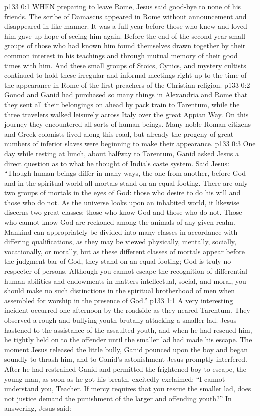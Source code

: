 \vs p133 0:1 WHEN preparing to leave Rome, Jesus said good\hyp{}bye to none of his friends. The scribe of Damascus appeared in Rome without announcement and disappeared in like manner. It was a full year before those who knew and loved him gave up hope of seeing him again. Before the end of the second year small groups of those who had known him found themselves drawn together by their common interest in his teachings and through mutual memory of their good times with him. And these small groups of Stoics, Cynics, and mystery cultists continued to hold these irregular and informal meetings right up to the time of the appearance in Rome of the first preachers of the Christian religion.
\vs p133 0:2 \pc Gonod and Ganid had purchased so many things in Alexandria and Rome that they sent all their belongings on ahead by pack train to Tarentum, while the three travelers walked leisurely across Italy over the great Appian Way. On this journey they encountered all sorts of human beings. Many noble Roman citizens and Greek colonists lived along this road, but already the progeny of great numbers of inferior slaves were beginning to make their appearance.
\vs p133 0:3 One day while resting at lunch, about halfway to Tarentum, Ganid asked Jesus a direct question as to what he thought of India’s caste system. Said Jesus: \textcolor{ubdarkred}{“Though human beings differ in many ways, the one from another, before God and in the spiritual world all mortals stand on an equal footing. There are only two groups of mortals in the eyes of God: those who desire to do his will and those who do not. As the universe looks upon an inhabited world, it likewise discerns two great classes: those who know God and those who do not. Those who cannot know God are reckoned among the animals of any given realm. Mankind can appropriately be divided into many classes in accordance with differing qualifications, as they may be viewed physically, mentally, socially, vocationally, or morally, but as these different classes of mortals appear before the judgment bar of God, they stand on an equal footing; God is truly no respecter of persons. Although you cannot escape the recognition of differential human abilities and endowments in matters intellectual, social, and moral, you should make no such distinctions in the spiritual brotherhood of men when assembled for worship in the presence of God.”}
\vs p133 1:1 A very interesting incident occurred one afternoon by the roadside as they neared Tarentum. They observed a rough and bullying youth brutally attacking a smaller lad. Jesus hastened to the assistance of the assaulted youth, and when he had rescued him, he tightly held on to the offender until the smaller lad had made his escape. The moment Jesus released the little bully, Ganid pounced upon the boy and began soundly to thrash him, and to Ganid’s astonishment Jesus promptly interfered. After he had restrained Ganid and permitted the frightened boy to escape, the young man, as soon as he got his breath, excitedly exclaimed: “I cannot understand you, Teacher. If mercy requires that you rescue the smaller lad, does not justice demand the punishment of the larger and offending youth?” In answering, Jesus said:
